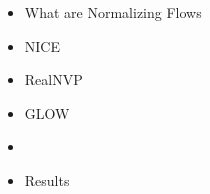 \begin{frame}
\begin{itemize}
    \item What are Normalizing Flows
    \item NICE
    \item RealNVP
    \item GLOW
    \item \textbf{\color{red}{GamePlan}}
    \item Results
\end{itemize}
\end{frame}
